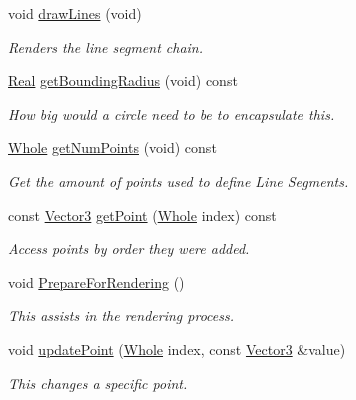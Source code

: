 \begin{DoxyCompactItemize}
void \hyperlink{classMezzanine_1_1LineGroup_a85da1685525915f1e07d685b98f79f23}{drawLines} (void)
\begin{DoxyCompactList}\small\item\em Renders the line segment chain. \item\end{DoxyCompactList}\item 
\hyperlink{namespaceMezzanine_a726731b1a7df72bf3583e4a97282c6f6}{Real} \hyperlink{classMezzanine_1_1LineGroup_acf6419a64d2d387bafe36b3dda752678}{getBoundingRadius} (void) const 
\begin{DoxyCompactList}\small\item\em How big would a circle need to be to encapsulate this. \item\end{DoxyCompactList}\item 
\hyperlink{namespaceMezzanine_adcbb6ce6d1eb4379d109e51171e2e493}{Whole} \hyperlink{classMezzanine_1_1LineGroup_a518e2ccf64cb6dc9bcc309a08d40f8c9}{getNumPoints} (void) const 
\begin{DoxyCompactList}\small\item\em Get the amount of points used to define Line Segments. \item\end{DoxyCompactList}\item 
const \hyperlink{classMezzanine_1_1Vector3}{Vector3} \hyperlink{classMezzanine_1_1LineGroup_a5a6aca5f86fa5751b335ee4a3d498cbf}{getPoint} (\hyperlink{namespaceMezzanine_adcbb6ce6d1eb4379d109e51171e2e493}{Whole} index) const 
\begin{DoxyCompactList}\small\item\em Access points by order they were added. \item\end{DoxyCompactList}\item 
void \hyperlink{classMezzanine_1_1LineGroup_ab94688dd800d390aefce0e6b9742b296}{PrepareForRendering} ()
\begin{DoxyCompactList}\small\item\em This assists in the rendering process. \item\end{DoxyCompactList}\item 
void \hyperlink{classMezzanine_1_1LineGroup_adfb54ecbd62dc13d42b4e05c1b30a155}{updatePoint} (\hyperlink{namespaceMezzanine_adcbb6ce6d1eb4379d109e51171e2e493}{Whole} index, const \hyperlink{classMezzanine_1_1Vector3}{Vector3} \&value)
\begin{DoxyCompactList}\small\item\em This changes a specific point. \item\end{DoxyCompactList}\end{DoxyCompactItemize}



